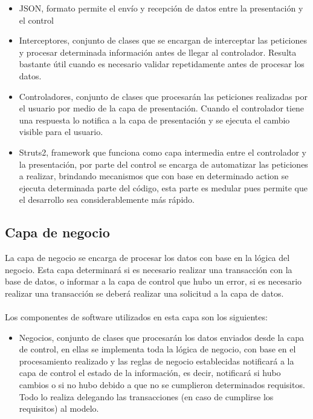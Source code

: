 \begin{itemize} 
	\item JSON, formato permite el envío y recepción de datos entre la presentación y el control
	\item Interceptores, conjunto de clases que se encargan de interceptar las peticiones y procesar determinada información antes de llegar al controlador. Resulta bastante útil cuando es necesario validar repetidamente antes de procesar los datos.
	\item Controladores, conjunto de clases que procesarán las peticiones realizadas por el usuario por medio de la capa de presentación. Cuando el controlador tiene una respuesta lo notifica a la capa de presentación y se ejecuta el cambio visible para el usuario.
	\item Struts2, framework que funciona como capa intermedia entre el controlador y la presentación, por parte del control se encarga de automatizar las peticiones a realizar, brindando mecanismos que con base en determinado action se ejecuta determinada parte del código, esta parte es medular pues permite que el desarrollo sea considerablemente más rápido.
\end{itemize}

\subsection{Capa de negocio}

La capa de negocio se encarga de procesar los datos con base en la lógica del negocio. Esta capa determinará si es necesario realizar una transacción con la base de datos, o  informar a la capa de control que hubo un error, si es necesario realizar una transacción se deberá realizar una solicitud a la capa de datos.\\\\
Los componentes de software utilizados en esta capa son los siguientes: \\
\begin{itemize} 
	\item Negocios, conjunto de clases que procesarán los datos enviados desde la capa de control, en ellas se implementa toda la lógica de negocio, con base en el procesamiento realizado y las reglas de negocio establecidas notificará a la capa de control el estado de la información, es decir, notificará si hubo cambios o si no hubo debido a que no se cumplieron determinados requisitos. Todo lo realiza delegando las transacciones (en caso de cumplirse los requisitos) al modelo. 
\end{itemize}

